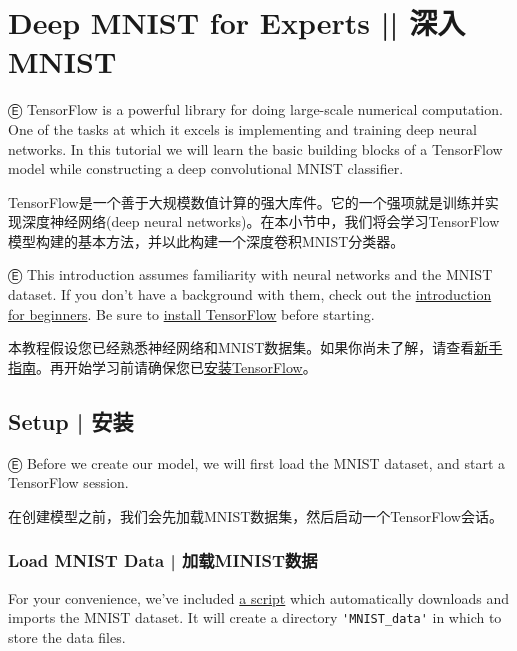 



\newpage
\section {\textcolor{etc}{Deep MNIST for Experts}   ||   深入MNIST} \label{MINIST_pros}

Ⓔ \textcolor{etc}{TensorFlow is a powerful library for doing large-scale numerical computation. One of the tasks at which it excels is implementing and training deep neural networks. In this tutorial we will learn the basic building blocks of a TensorFlow model while constructing a deep convolutional MNIST classifier.}

TensorFlow是一个善于大规模数值计算的强大库件。它的一个强项就是训练并实现深度神经网络(deep neural networks)。在本小节中，我们将会学习TensorFlow模型构建的基本方法，并以此构建一个深度卷积MNIST分类器。

Ⓔ \textcolor{etc}{This introduction assumes familiarity with neural networks and the MNIST dataset. If you don't have a background with them, check out the \hyperref[MINIST_beginner]{introduction for beginners}. Be sure to \hyperref[download_install]{install TensorFlow} before starting.}

本教程假设您已经熟悉神经网络和MNIST数据集。如果你尚未了解，请查看\hyperref[MINIST_beginner]{新手指南}。再开始学习前请确保您已\hyperref[download_install]{安装TensorFlow}。

%
\subsection {Setup  |  安装}

Ⓔ \textcolor{etc}{Before we create our model, we will first load the MNIST dataset, and start a TensorFlow session.}

在创建模型之前，我们会先加载MNIST数据集，然后启动一个TensorFlow会话。

\subsubsection {Load MNIST Data  |  加载MINIST数据}

\textcolor{etc}{For your convenience, we've included \href{https://tensorflow.googlesource.com/tensorflow/+/master/tensorflow/examples/tutorials/mnist/input_data.py}{a script} which automatically downloads and imports the MNIST dataset. It will create a directory \lstinline{'MNIST_data'} in which to store the data files.}

